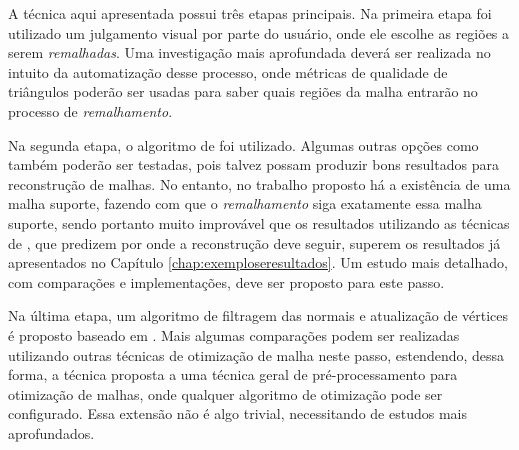 A técnica aqui apresentada possui três etapas principais. Na primeira etapa foi utilizado um julgamento visual por parte do usuário, onde ele escolhe as regiões a serem \textit{remalhadas}. Uma investigação mais aprofundada deverá ser realizada no intuito da automatização desse processo, onde métricas de qualidade de triângulos poderão ser usadas para saber quais regiões da malha entrarão no processo de \textit{remalhamento}. 

Na segunda etapa, o algoritmo de \cite{miranda2009surface} foi utilizado. Algumas outras opções como \cite{attene2013polygon, zhao2007robust} também poderão ser testadas, pois talvez possam produzir bons resultados para reconstrução de malhas. No entanto, no trabalho proposto há a existência de uma malha suporte, fazendo com que o \textit{remalhamento} siga exatamente essa malha suporte, sendo portanto muito improvável que os resultados utilizando as técnicas de \cite{attene2013polygon, zhao2007robust}, que predizem por onde a reconstrução deve seguir, superem os resultados já apresentados no Capítulo \ref{chap:exemploseresultados}. Um estudo mais detalhado, com comparações e implementações, deve ser proposto para este passo.

Na última etapa, um algoritmo de filtragem das normais e atualização de vértices é proposto baseado em \cite{zhang2015guided}. Mais algumas comparações podem ser realizadas utilizando outras técnicas de otimização de malha neste passo, estendendo, dessa forma, a técnica proposta a uma técnica geral de pré-processamento para otimização de malhas, onde qualquer algoritmo de otimização pode ser configurado. Essa extensão não é algo trivial, necessitando de estudos mais aprofundados.

